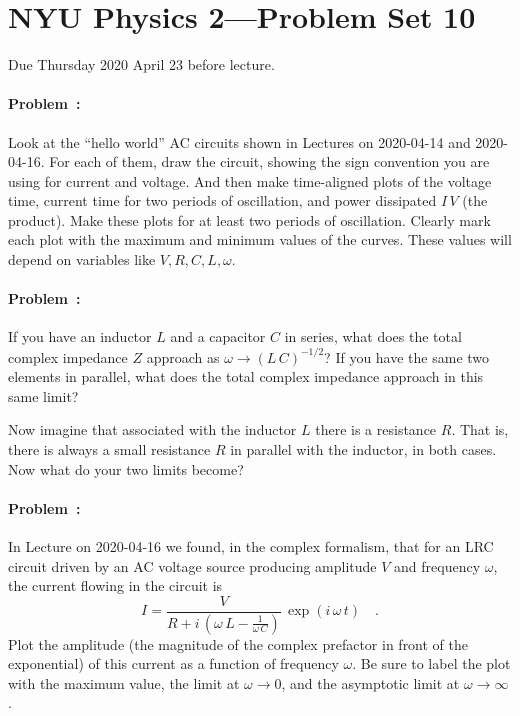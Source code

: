 \documentclass[12pt]{article}
\begin{document}
\section*{NYU Physics 2---Problem Set 10}

Due Thursday 2020 April 23 before lecture.

\paragraph{Problem~\theproblem:}%
Look at the ``hello world'' AC circuits shown in Lectures on
2020-04-14 and 2020-04-16. For each of them, draw the circuit, showing
the sign convention you are using for current and voltage. And then
make time-aligned plots of the voltage  time, current
 time for two periods of oscillation, and power dissipated
$I\,V$ (the product). Make these plots for at least two periods of
oscillation. Clearly mark each plot with the maximum and minimum
values of the curves. These values will depend on variables like $V,
R, C, L, \omega$.

\paragraph{Problem~\theproblem:}%
If you have an inductor $L$ and a capacitor $C$ in series, what does
the total complex impedance $Z$ approach as $\omega\rightarrow
(L\,C)^{-1/2}$? If you have the same two elements in parallel, what
does the total complex impedance approach in this same limit?

Now imagine that associated with the inductor $L$ there is a
resistance $R$. That is, there is always a small resistance $R$ in
parallel with the inductor, in both cases. Now what do your two limits
become?

\paragraph{Problem~\theproblem:}%
In Lecture on 2020-04-16 we found, in the complex formalism, that for
an LRC circuit driven by an AC voltage source producing amplitude $V$ and frequency $\omega$, the current flowing in the
circuit is
\begin{equation}\label{eq:res}
  I = \frac{V}{R + i\,\left(\omega\,L - \frac{1}{\omega\,C}\right)}\,\exp(i\,\omega\,t)
  \quad .
\end{equation}
Plot the amplitude (the magnitude of the complex prefactor in front of
the exponential) of this current as a function of frequency
$\omega$. Be sure to label the plot with the maximum value, the limit
at $\omega\rightarrow 0$, and the asymptotic limit at
$\omega\rightarrow\infty$.
\end{document}

